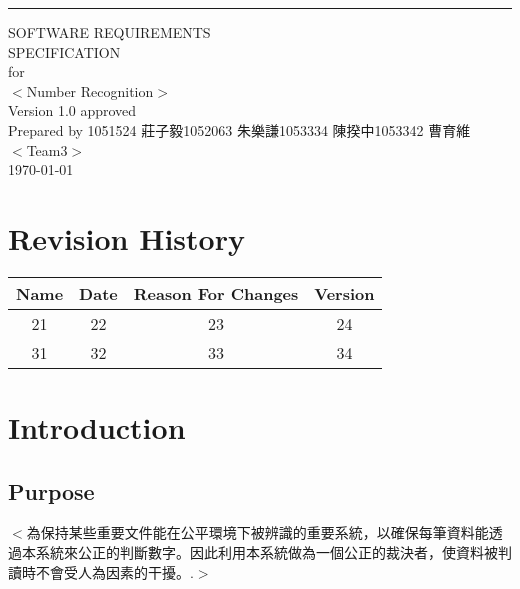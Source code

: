 \documentclass{scrreprt}
\date{}
\def\myversion{1.0 }
\begin{document}
\begin{CJK*}{UTF8}{bsmi}
\begin{flushright}
    \rule{16cm}{5pt}\vskip1cm
    \begin{bfseries}
        \Huge{SOFTWARE REQUIREMENTS\\ SPECIFICATION}\\
        \vspace{1.9cm}
        for\\
        \vspace{1.9cm}
        $<$Number Recognition$>$\\
        \vspace{1.9cm}
        \LARGE{Version \myversion approved}\\
        \vspace{1.9cm}
        Prepared by 1051524 莊子毅\hspace{0.5cm}1052063 朱樂謙\hspace{0.5cm}1053334 陳揆中\hspace{0.5cm}1053342 曹育維\\
        \vspace{1.9cm}
        $<$Team3$>$\\
        \vspace{1.9cm}
        \today\\
    \end{bfseries}
\end{flushright}

\tableofcontents


\chapter*{Revision History}

\begin{center}
    \begin{tabular}{|c|c|c|c|}
        \hline
	    Name & Date & Reason For Changes & Version\\
        \hline
	    21 & 22 & 23 & 24\\
        \hline
	    31 & 32 & 33 & 34\\
        \hline
    \end{tabular}
\end{center}

\chapter{Introduction}

\section{Purpose}
$<$為保持某些重要文件能在公平環境下被辨識的重要系統，以確保每筆資料能透過本系統來公正的判斷數字。因此利用本系統做為一個公正的裁決者，使資料被判讀時不會受人為因素的干擾。.$>$



\end{CJK*}
\end{document}
